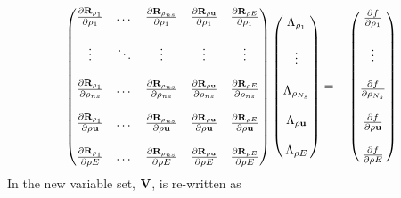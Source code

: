 \documentclass[a4paper]{report}
\begin{document}
\begin{equation}
  \begin{pmatrix}
    \rdiff{\rho_1}{\rho_1}    & \dots  & \rdiff{\rho_{ns}}{\rho_1}    & \rdiff{\rho \vu}{\rho_1}    & \rdiff{\rho E}{\rho_1}    \\ \\
    \vdots                    & \ddots & \vdots                       & \vdots                      & \vdots                    \\ \\
    \rdiff{\rho_1}{\rho_{ns}} & \dots  & \rdiff{\rho_{ns}}{\rho_{ns}} & \rdiff{\rho \vu}{\rho_{ns}} & \rdiff{\rho E}{\rho_{ns}} \\ \\
    \rdiff{\rho_1}{\rho \vu}  & \dots  & \rdiff{\rho_{ns}}{\rho \vu}  & \rdiff{\rho \vu}{\rho \vu}  & \rdiff{\rho E}{\rho \vu}  \\ \\
    \rdiff{\rho_1}{\rho E}    & \dots  & \rdiff{\rho_{ns}}{\rho E}    & \rdiff{\rho \vu}{\rho E}    & \rdiff{\rho E}{\rho E}
  \end{pmatrix}
  \begin{pmatrix}
    \adjlam{\rho_1}     \\ \\
    \vdots              \\ \\
    \adjlam{\rho_{N_s}} \\ \\
    \adjlam{\rho \vu}   \\ \\
    \adjlam{\rho E}
  \end{pmatrix}
  = -
  \begin{pmatrix}
    \pd{f}{\rho_1}     \\ \\
    \vdots           \\ \\
    \pd{f}{\rho_{N_s}} \\ \\
    \pd{f}{\rho \vu}   \\ \\
    \pd{f}{\rho E}
  \end{pmatrix}
  \label{fc-adj}
\end{equation}
In the new variable set, $\mathbf V$,  is re-written as
\end{document}
